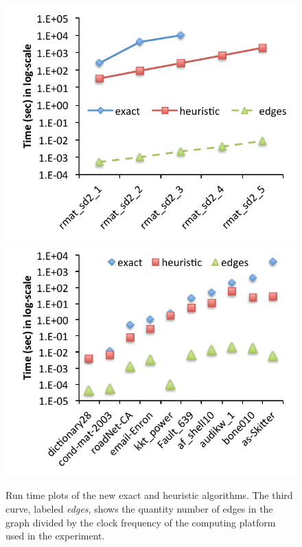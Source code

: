 \begin{figure}
    \includegraphics[scale=0.67]{compare_time_sd2.pdf}
    \includegraphics[scale=0.67]{compare_time_rw.pdf}
    
 \caption{Run time plots of the new exact and heuristic algorithms. The third curve, labeled
 {\em edges}, shows the quantity number of edges in the graph divided by the clock 
 frequency of the computing platform used in the experiment. 
 }
\label{fig-runtimeplots}
\end{figure}



